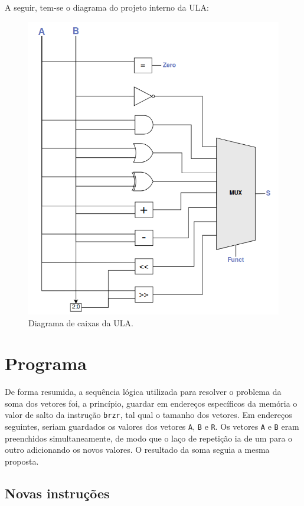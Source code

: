 \documentclass[twocolumn, 11pt]{article}
\begin{document}
A seguir, tem-se o diagrama do projeto interno da ULA:

\begin{figure}[h]
    \centering
    \includegraphics[width=0.9\linewidth]{projeto_ula.png}
    \caption{Diagrama de caixas da ULA.}
    \label{fig:enter-label}
\end{figure}

\section{Programa}

De forma resumida, a sequência lógica utilizada para resolver o problema da soma dos vetores foi, a princípio, guardar em endereços específicos da memória o valor de salto da instrução \texttt{brzr}, tal qual o tamanho dos vetores. Em endereços seguintes, seriam guardados os valores dos vetores \texttt{A}, \texttt{B} e \texttt{R}. Os vetores \texttt{A} e \texttt{B} eram preenchidos simultaneamente, de modo que o laço de repetição ia de um para o outro adicionando os novos valores. O resultado da soma seguia a mesma proposta.

\subsection{Novas instruções}
\end{document}
